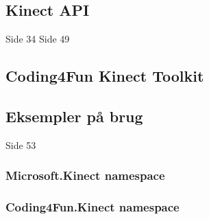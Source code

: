 \subsection{Kinect API}
Side 34
Side 49


\subsection{Coding4Fun Kinect Toolkit}


\subsection{Eksempler på brug}
Side 53

\subsubsection{Microsoft.Kinect namespace}

\subsubsection{Coding4Fun.Kinect namespace}

